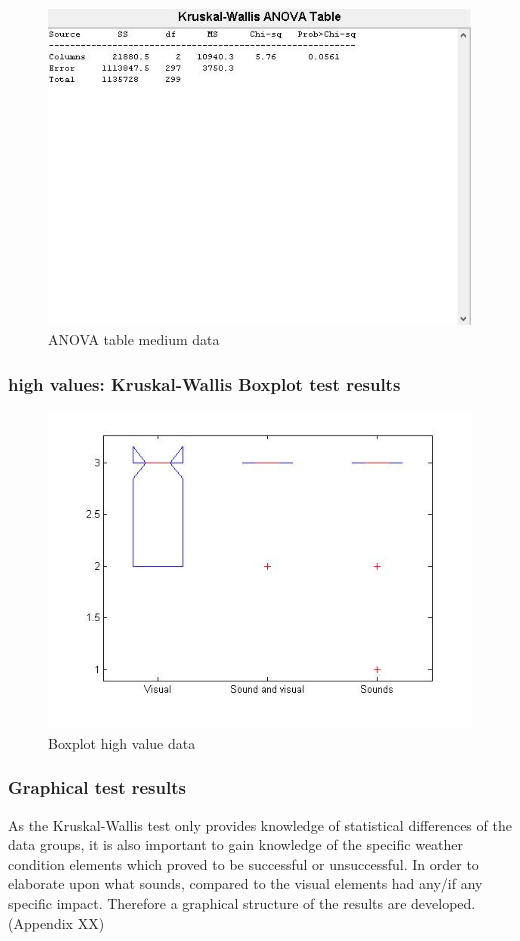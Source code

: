 \begin{figure}[!htbp]
    \centering
    \includegraphics[width=.7\textwidth]{images/Evaluation6.jpg}
    \caption{ANOVA table medium data}
    \label{fig:evaluation2}
\end{figure}


\FloatBarrier


\subsubsection*{high values: Kruskal-Wallis Boxplot test results} %
\label{ssub:high_values_kruskal_wallis_test_results}

\begin{figure}[!htbp]
    \centering
    \includegraphics[width=.5\textwidth]{images/Evaluation8.jpg}
    \caption{Boxplot high value data}
    \label{fig:evaluation5}
\end{figure}


\subsubsection{Graphical test results} %
\label{ssub:graphical_test_results}

As the Kruskal-Wallis test only provides knowledge of statistical differences of the data groups, it is also important to gain knowledge of the specific weather condition elements which proved to be successful or unsuccessful. 
In order to elaborate upon what sounds, compared to the visual elements had any/if any specific impact. 
Therefore a graphical structure of the results are developed. (Appendix XX)

